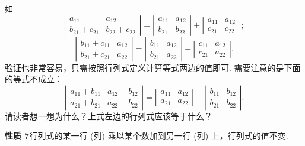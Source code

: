 \documentclass[UTF8,12pt,a4paper,fontset=fandol]{ctexart}
\begin{document}
如
\[
\left|\begin{array}{cc}
a_{11} & a_{12}\\
b_{21}+c_{21} & b_{22}+c_{22}
\end{array}\right|
=
\left|\begin{array}{cc}
a_{11} & a_{12}\\
b_{21} & b_{22}
\end{array}\right|
+
\left|\begin{array}{cc}
a_{11} & a_{12}\\
c_{21} & c_{22}
\end{array}\right|;
\]
\[
\left|\begin{array}{cc}
b_{11}+c_{11} & a_{12}\\
b_{21}+c_{21} & a_{22}
\end{array}\right|
=
\left|\begin{array}{cc}
b_{11} & a_{12}\\
b_{21} & a_{22}
\end{array}\right|
+
\left|\begin{array}{cc}
c_{11} & a_{12}\\
c_{21} & a_{22}
\end{array}\right|.
\]
验证也非常容易，只需按照行列式定义计算等式两边的值即可. 需要注意的是下面的等式不成立：
\[
\left|\begin{array}{cc}
a_{11}+b_{11} & a_{12}+b_{12}\\
a_{21}+b_{21} & a_{22}+b_{22}
\end{array}\right|
=
\left|\begin{array}{cc}
a_{11} & a_{12}\\
a_{21} & a_{22}
\end{array}\right|
+
\left|\begin{array}{cc}
b_{11} & b_{12}\\
b_{21} & b_{22}
\end{array}\right|.
\]
请读者想一想为什么？上式左边的行列式应该等于什么？

\noindent\textbf{性质 7}\quad 行列式的某一行 (列) 乘以某个数加到另一行 (列) 上，行列式的值不变.
\end{document}
